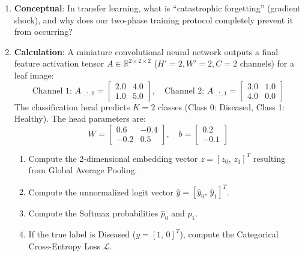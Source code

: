 \begin{checkyourself}
\begin{enumerate}
    \item \textbf{Conceptual}: In transfer learning, what is ``catastrophic forgetting'' (gradient shock), and why does our two-phase training protocol completely prevent it from occurring?
    \item \textbf{Calculation}: A miniature convolutional neural network outputs a final feature activation tensor $A \in \mathbb{R}^{2 \times 2 \times 2}$ ($H'=2, W'=2, C=2$ channels) for a leaf image:
    \begin{equation*}
    \text{Channel 1: } A_{:,:,0} = \begin{bmatrix} 2.0 & 4.0 \\ 1.0 & 5.0 \end{bmatrix}, \quad
    \text{Channel 2: } A_{:,:,1} = \begin{bmatrix} 3.0 & 1.0 \\ 4.0 & 0.0 \end{bmatrix}
    \end{equation*}
    The classification head predicts $K = 2$ classes (Class 0: Diseased, Class 1: Healthy). The head parameters are:
    \begin{equation*}
    W = \begin{bmatrix} 0.6 & -0.4 \\ -0.2 & 0.5 \end{bmatrix}, \quad
    b = \begin{bmatrix} 0.2 \\ -0.1 \end{bmatrix}
    \end{equation*}
    \begin{enumerate}
        \item Compute the 2-dimensional embedding vector $z = [z_0,\, z_1]^T$ resulting from Global Average Pooling.
        \item Compute the unnormalized logit vector $\hat{y} = [\hat{y}_0,\, \hat{y}_1]^T$.
        \item Compute the Softmax probabilities $\hat{p}_0$ and $\hat{p}_1$.
        \item If the true label is Diseased ($y = [1,\, 0]^T$), compute the Categorical Cross-Entropy Loss $\mathcal{L}$.
    \end{enumerate}

\end{enumerate}
\end{checkyourself}
